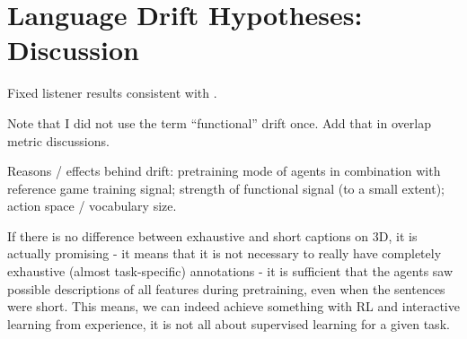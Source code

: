 

\section{Language Drift Hypotheses: Discussion}

Fixed listener results consistent with \cite{lazaridou2020multi}.

Note that I did not use the term ``functional'' drift once. Add that in overlap metric discussions.

Reasons / effects behind drift: pretraining mode of agents in combination with reference game training signal; strength of functional signal (to a small extent); action space / vocabulary size. 

If there is no difference between exhaustive and short captions on 3D, it is actually promising - it means that it is not necessary to really have completely exhaustive (almost task-specific) annotations - it is sufficient that the agents saw possible descriptions of all features during pretraining, even when the sentences were short. This means, we can indeed achieve something with RL and interactive learning from experience, it is not all about supervised learning for a given task.